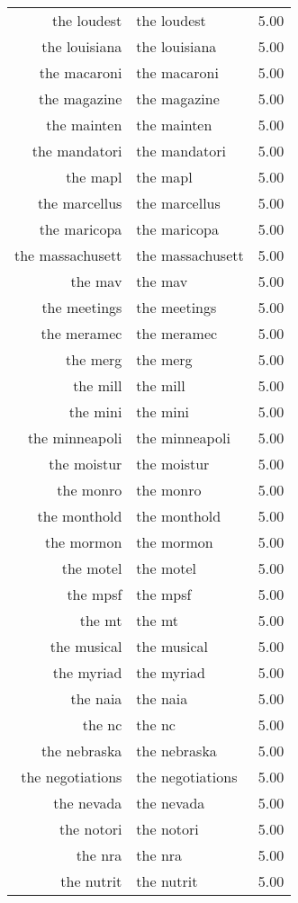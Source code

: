 \begin{table}[ht]
\begin{tabular}{rlr}
  the loudest & the loudest & 5.00 \\ 
  the louisiana & the louisiana & 5.00 \\ 
  the macaroni & the macaroni & 5.00 \\ 
  the magazine & the magazine & 5.00 \\ 
  the mainten & the mainten & 5.00 \\ 
  the mandatori & the mandatori & 5.00 \\ 
  the mapl & the mapl & 5.00 \\ 
  the marcellus & the marcellus & 5.00 \\ 
  the maricopa & the maricopa & 5.00 \\ 
  the massachusett & the massachusett & 5.00 \\ 
  the mav & the mav & 5.00 \\ 
  the meetings & the meetings & 5.00 \\ 
  the meramec & the meramec & 5.00 \\ 
  the merg & the merg & 5.00 \\ 
  the mill & the mill & 5.00 \\ 
  the mini & the mini & 5.00 \\ 
  the minneapoli & the minneapoli & 5.00 \\ 
  the moistur & the moistur & 5.00 \\ 
  the monro & the monro & 5.00 \\ 
  the monthold & the monthold & 5.00 \\ 
  the mormon & the mormon & 5.00 \\ 
  the motel & the motel & 5.00 \\ 
  the mpsf & the mpsf & 5.00 \\ 
  the mt & the mt & 5.00 \\ 
  the musical & the musical & 5.00 \\ 
  the myriad & the myriad & 5.00 \\ 
  the naia & the naia & 5.00 \\ 
  the nc & the nc & 5.00 \\ 
  the nebraska & the nebraska & 5.00 \\ 
  the negotiations & the negotiations & 5.00 \\ 
  the nevada & the nevada & 5.00 \\ 
  the notori & the notori & 5.00 \\ 
  the nra & the nra & 5.00 \\ 
  the nutrit & the nutrit & 5.00 \\ 

\end{tabular}
\end{table}
